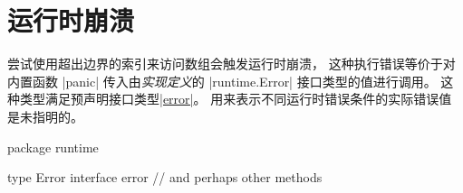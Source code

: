 \chapter{运行时崩溃} \label{ch:run-time panics}
尝试使用超出边界的索引来访问数组会触发运行时崩溃，
这种执行错误等价于对内置函数 \gocode|panic|
传入由\emph{实现定义}的 \gocode|runtime.Error| 接口类型的值进行调用。
这种类型满足预声明接口类型\hyperref[ch:errors]{\gocode|error|}。
用来表示不同运行时错误条件的实际错误值是未指明的。
\begin{golang}
package runtime

type Error interface {
	error
	// and perhaps other methods
}
\end{golang}